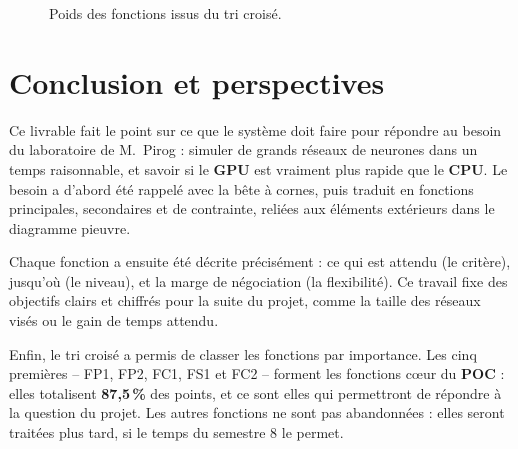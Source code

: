 \begin{figure}[H]
\centering
{}
\caption{Poids des fonctions issus du tri croisé.}
\label{fig:barres}
\end{figure}

\chapter{Conclusion et perspectives}

Ce livrable fait le point sur ce que le système doit faire pour répondre au besoin du laboratoire de M.~Pirog : simuler de grands réseaux de neurones dans un temps raisonnable, et savoir si le \textbf{GPU} est vraiment plus rapide que le \textbf{CPU}. Le besoin a d'abord été rappelé avec la bête à cornes, puis traduit en fonctions principales, secondaires et de contrainte, reliées aux éléments extérieurs dans le diagramme pieuvre.

Chaque fonction a ensuite été décrite précisément : ce qui est attendu (le critère), jusqu'où (le niveau), et la marge de négociation (la flexibilité). Ce travail fixe des objectifs clairs et chiffrés pour la suite du projet, comme la taille des réseaux visés ou le gain de temps attendu.

Enfin, le tri croisé a permis de classer les fonctions par importance. Les cinq premières -- FP1, FP2, FC1, FS1 et FC2 -- forment les fonctions cœur du \textbf{POC} : elles totalisent \textbf{87,5\,\%} des points, et ce sont elles qui permettront de répondre à la question du projet. Les autres fonctions ne sont pas abandonnées : elles seront traitées plus tard, si le temps du semestre 8 le permet.

